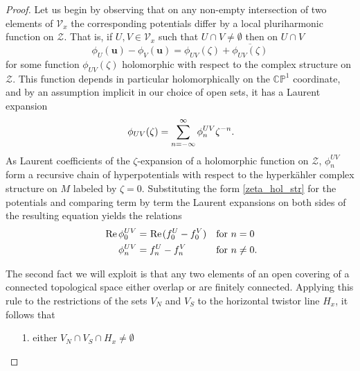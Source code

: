 \documentclass[11pt]{amsart}
\theoremstyle{remark}
\theoremstyle{remark}
\theoremstyle{definition}
\theoremstyle{definition}
\theoremstyle{definition}
\newcommand{\0}{{\scriptstyle 0'}} %
\newcommand{\1}{{\scriptstyle 1'}}
\newcommand{\pt}{\hspace{1pt}} %
\newcommand{\hp}{\hspace{0.5pt}} %
\renewcommand{\Re}{\hp\mbox{Re}\pt} %
\begin{document}
\begin{proof}

Let us begin by observing that on any non-empty intersection of two elements of $\mathscr{V}_x$ the corresponding potentials differ by a local pluriharmonic function on $\mathcal{Z}$. That is, if $U,V \in \mathscr{V}_x$ such that $U \cap V \neq \emptyset$ then on $U \cap V$
\begin{equation}
\phi_U(\mathbf{u}) - \phi_V(\mathbf{u}) = \phi_{UV}(\zeta) + \overline{\phi_{UV}(\zeta)}
\end{equation}
for some function $\phi_{UV}(\zeta)$ holomorphic with respect to the complex structure on $\mathcal{Z}$. This function depends in particular holomorphically on the $\mathbb{CP}^1$ coordinate, and by an assumption implicit in our choice of open sets, it has a Laurent expansion
\begin{equation}
\phi_{UV}(\zeta) = \sum_{n=-\infty}^{\infty} \phi^{UV}_n \zeta^{-n} \rlap{.}
\end{equation}
As Laurent coefficients of the $\zeta$-expansion of a holomorphic function on $\mathcal{Z}$, $\phi^{UV}_n$ form a recursive chain of hyperpotentials with respect to the hyperk\"ahler complex structure on $M$ labeled by $\zeta = 0$. Substituting the form \eqref{zeta_hol_str} for the potentials and comparing term by term the Laurent expansions on both sides of the resulting equation yields the relations 
\begin{equation} \label{fs-and-phis}
\begin{aligned}
\Re \hp \phi^{UV}_0 & = \Re (f^U_0 - f^V_0) && \text{for $n=0$} \\
\phi^{UV}_n & = f^U_n - f^V_n && \text{for $n\neq 0$} \rlap{.}
\end{aligned}
\end{equation}

The second fact we will exploit is that any two elements of an open covering of a connected topological space either overlap or are finitely connected. Applying this rule to the restrictions of the sets $V_N$ and $V_S$ to the horizontal twistor line $H_x$, it follows that 
\begin{itemize}
\setlength{\itemsep}{2pt}
\item[1.] either $V_N \cap V_S \cap H_x \neq \emptyset$


\end{itemize}
\end{proof}
\end{document}
